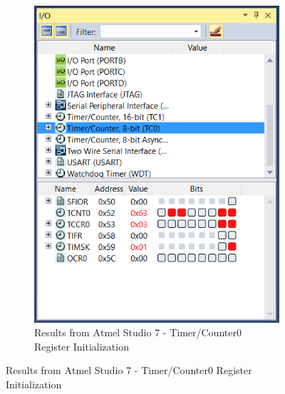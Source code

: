 \documentclass{article}
\begin{document}
\begin{figure}[h!]
	\begin{subfigure}[t]{0.5\textwidth}
		\centering
		\includegraphics[width=0.5\linewidth]{./results/lab1b_reg_init.png}
		\caption{Results from Αtmel Studio 7 - Timer/Counter0 Register Initialization}
	\end{subfigure}
\end{figure}
\end{document}

